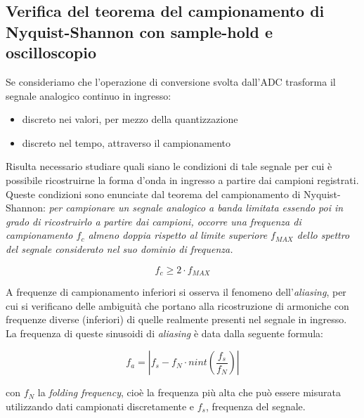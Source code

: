 \documentclass[journal]{IEEEtran}
\begin{document}


\subsection{Verifica del teorema del campionamento di Nyquist-Shannon con sample-hold e oscilloscopio}

Se consideriamo che l'operazione di conversione svolta dall'ADC trasforma il segnale analogico continuo in ingresso:
\begin{itemize}
   \item discreto nei valori, per mezzo della quantizzazione
   \item discreto nel tempo, attraverso il campionamento
\end{itemize}

Risulta necessario studiare quali siano le condizioni di tale segnale per cui è possibile ricostruirne la forma d'onda in ingresso a partire dai campioni registrati. Queste condizioni sono enunciate dal teorema del campionamento di Nyquist-Shannon: \textit{per campionare un segnale analogico a banda limitata essendo poi in grado di ricostruirlo a partire dai campioni, occorre una frequenza di campionamento $f_c$ almeno doppia rispetto al limite superiore $f_{MAX}$ dello spettro del segnale considerato nel suo dominio di frequenza.}

\begin{equation}
    f_c \ge 2 \cdot f_{MAX}
\end{equation}

A frequenze di campionamento inferiori si osserva il fenomeno dell'\textit{aliasing}, per cui si verificano delle ambiguità che portano alla ricostruzione di armoniche con frequenze diverse (inferiori) di quelle realmente presenti nel segnale in ingresso. La frequenza di queste sinusoidi di \textit{aliasing} è data dalla seguente formula:

\begin{equation}
    f_a = |f_s - f_N \cdot nint(\frac{f_s}{f_N})|
\end{equation}

con $f_N$ la \textit{folding frequency}, cioè la frequenza più alta che può essere misurata utilizzando dati campionati discretamente e $f_s$, frequenza del segnale.

\end{document}
